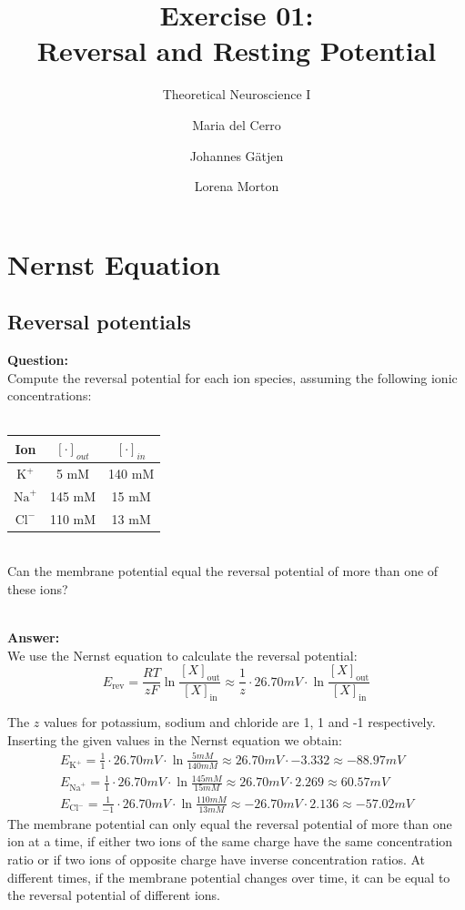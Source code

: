 \documentclass{scrartcl}
\title{Exercise 01:\\Reversal and Resting Potential}
\subtitle{Theoretical Neuroscience I}
\author{Maria del Cerro \and Johannes G\"atjen \and Lorena Morton}
\newcommand\Answer{%
  \textbf{\\Answer:}%
}
\newcommand\Question{%
  \textbf{Question:}%
}
\begin{document}
\maketitle

\section{Nernst Equation}
\subsection{Reversal potentials}

\Question\\
Compute the reversal potential for each ion species, assuming the following ionic concentrations:\\
\\
\begin{tabular}{c | c c}
Ion & $[\cdot]_{out}$ & $[\cdot]_{in}$ \\ \hline
$\text{K}^+$ & 5 mM & 140 mM \\
$\text{Na}^+$ & 145 mM & 15 mM \\
$\text{Cl}^-$ & 110 mM & 13 mM
\end{tabular}\\
Can the membrane potential equal the reversal potential of more than one of these ions?

\Answer\\
We use the Nernst equation to calculate the reversal potential:
\begin{equation*}
E_{\text{rev}}=\frac{RT}{zF}\ln \frac{[X]_{\text{out}}}{[X]_{\text{in}}} \approx \frac{1}{z} \cdot 26.70 \si{mV} \cdot \ln \frac{[X]_{\text{out}}}{[X]_{\text{in}}}
\end{equation*}

The $z$ values for potassium, sodium and chloride are 1, 1 and -1 respectively. Inserting the given values in the Nernst equation we obtain:
\begin{equation*}
\begin{split}
E_{\text{K}^+}=\frac{1}{1} \cdot 26.70 \si{mV} \cdot \ln \frac{5 \si{mM}}{140 \si{mM}} \approx 26.70 \si{mV} \cdot -3.332 \approx -88.97 \si{mV}\\
E_{\text{Na}^+}=\frac{1}{1} \cdot 26.70 \si{mV} \cdot \ln \frac{145 \si{mM}}{15 \si{mM}} \approx 26.70 \si{mV} \cdot 2.269 \approx 60.57 \si{mV}\\
E_{\text{Cl}^-}=\frac{1}{-1} \cdot 26.70 \si{mV} \cdot \ln \frac{110 \si{mM}}{13 \si{mM}} \approx {-26.70} \si{mV} \cdot 2.136 \approx -57.02 \si{mV}
\end{split}
\end{equation*}
The membrane potential can only equal the reversal potential of more than one ion at a time, if either two ions of the same charge have the same concentration ratio or if two ions of opposite charge have inverse concentration ratios. At different times, if the membrane potential changes over time, it can be equal to the reversal potential of different ions.
\pagebreak
\end{document}
